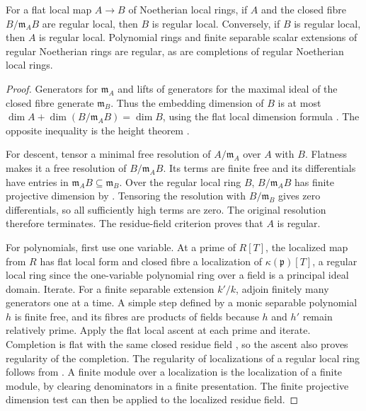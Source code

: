 \begin{lemma}\label{res:X02}
For a flat local map \(A\to B\) of Noetherian local rings, if \(A\) and the closed fibre \(B/\mathfrak m_A B\) are regular local, then \(B\) is regular local. Conversely, if \(B\) is regular local, then \(A\) is regular local. Polynomial rings and finite separable scalar extensions of regular Noetherian rings are regular, as are completions of regular Noetherian local rings.
\end{lemma}
\begin{proof}
Generators for \(\mathfrak m_A\) and lifts of generators for the maximal ideal of the closed fibre generate \(\mathfrak m_B\). Thus the embedding dimension of \(B\) is at most \(\dim A+\dim(B/\mathfrak m_A B)=\dim B\), using the flat local dimension formula \cite[CM-10]{core}. The opposite inequality is the height theorem \cite[ALG-05-C03-R01]{p103}.

For descent, tensor a minimal free resolution of \(A/\mathfrak m_A\) over \(A\) with \(B\). Flatness makes it a free resolution of \(B/\mathfrak m_A B\). Its terms are finite free and its differentials have entries in \(\mathfrak m_A B\subseteq\mathfrak m_B\). Over the regular local ring \(B\), \(B/\mathfrak m_A B\) has finite projective dimension by \cite[CM-12]{core}. Tensoring the resolution with \(B/\mathfrak m_B\) gives zero differentials, so all sufficiently high terms are zero. The original resolution therefore terminates. The residue-field criterion \cite[CM-19]{core} proves that \(A\) is regular.

For polynomials, first use one variable. At a prime of \(R[T]\), the localized map from \(R\) has flat local form and closed fibre a localization of \(\kappa(\mathfrak p)[T]\), a regular local ring since the one-variable polynomial ring over a field is a principal ideal domain. Iterate. For a finite separable extension \(k'/k\), adjoin finitely many generators one at a time. A simple step defined by a monic separable polynomial \(h\) is finite free, and its fibres are products of fields because \(h\) and \(h'\) remain relatively prime. Apply the flat local ascent at each prime and iterate. Completion is flat with the same closed residue field \cite[ALG-05-C04-S01]{p103}, so the ascent also proves regularity of the completion. The regularity of localizations of a regular local ring follows from \cite[CM-12, CM-19]{core}. A finite module over a localization is the localization of a finite module, by clearing denominators in a finite presentation. The finite projective dimension test can then be applied to the localized residue field.
\end{proof}

